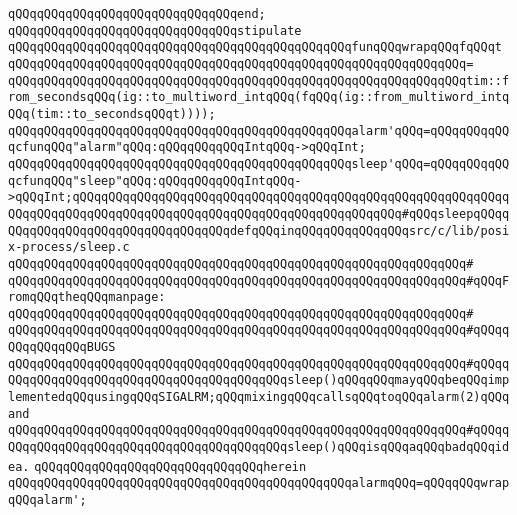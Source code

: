 \verb|qQQqqQQqqQQqqQQqqQQqqQQqqQQqqQQqend;|\newline
\newline
\newline
\verb|qQQqqQQqqQQqqQQqqQQqqQQqqQQqqQQqstipulate|\newline
\verb|qQQqqQQqqQQqqQQqqQQqqQQqqQQqqQQqqQQqqQQqqQQqqQQqfunqQQqwrapqQQqfqQQqt|\newline
\verb|qQQqqQQqqQQqqQQqqQQqqQQqqQQqqQQqqQQqqQQqqQQqqQQqqQQqqQQqqQQqqQQq=|\newline
\verb|qQQqqQQqqQQqqQQqqQQqqQQqqQQqqQQqqQQqqQQqqQQqqQQqqQQqqQQqqQQqqQQqtim::from_secondsqQQq(ig::to_multiword_intqQQq(fqQQq(ig::from_multiword_intqQQq(tim::to_secondsqQQqt))));|\newline
\newline
\verb|qQQqqQQqqQQqqQQqqQQqqQQqqQQqqQQqqQQqqQQqqQQqqQQqalarm'qQQq=qQQqqQQqqQQqcfunqQQq"alarm"qQQq:qQQqqQQqqQQqIntqQQq->qQQqInt;|\newline
\verb|qQQqqQQqqQQqqQQqqQQqqQQqqQQqqQQqqQQqqQQqqQQqqQQqsleep'qQQq=qQQqqQQqqQQqcfunqQQq"sleep"qQQq:qQQqqQQqqQQqIntqQQq->qQQqInt;qQQqqQQqqQQqqQQqqQQqqQQqqQQqqQQqqQQqqQQqqQQqqQQqqQQqqQQqqQQqqQQqqQQqqQQqqQQqqQQqqQQqqQQqqQQqqQQqqQQqqQQqqQQqqQQqqQQq#qQQqsleepqQQqqQQqqQQqqQQqqQQqqQQqqQQqqQQqqQQqdefqQQqinqQQqqQQqqQQqqQQqsrc/c/lib/posix-process/sleep.c|\newline
\verb|qQQqqQQqqQQqqQQqqQQqqQQqqQQqqQQqqQQqqQQqqQQqqQQqqQQqqQQqqQQqqQQq#|\newline
\verb|qQQqqQQqqQQqqQQqqQQqqQQqqQQqqQQqqQQqqQQqqQQqqQQqqQQqqQQqqQQqqQQq#qQQqFromqQQqtheqQQqmanpage:|\newline
\verb|qQQqqQQqqQQqqQQqqQQqqQQqqQQqqQQqqQQqqQQqqQQqqQQqqQQqqQQqqQQqqQQq#|\newline
\verb|qQQqqQQqqQQqqQQqqQQqqQQqqQQqqQQqqQQqqQQqqQQqqQQqqQQqqQQqqQQqqQQq#qQQqqQQqqQQqqQQqBUGS|\newline
\verb|qQQqqQQqqQQqqQQqqQQqqQQqqQQqqQQqqQQqqQQqqQQqqQQqqQQqqQQqqQQqqQQq#qQQqqQQqqQQqqQQqqQQqqQQqqQQqqQQqqQQqqQQqqQQqsleep()qQQqqQQqmayqQQqbeqQQqimplementedqQQqusingqQQqSIGALRM;qQQqmixingqQQqcallsqQQqtoqQQqalarm(2)qQQqand|\newline
\verb|qQQqqQQqqQQqqQQqqQQqqQQqqQQqqQQqqQQqqQQqqQQqqQQqqQQqqQQqqQQqqQQq#qQQqqQQqqQQqqQQqqQQqqQQqqQQqqQQqqQQqqQQqqQQqsleep()qQQqisqQQqaqQQqbadqQQqidea.|\newline
\newline
\verb|qQQqqQQqqQQqqQQqqQQqqQQqqQQqqQQqherein|\newline
\newline
\verb|qQQqqQQqqQQqqQQqqQQqqQQqqQQqqQQqqQQqqQQqqQQqqQQqalarmqQQq=qQQqqQQqwrapqQQqalarm';|\newline
